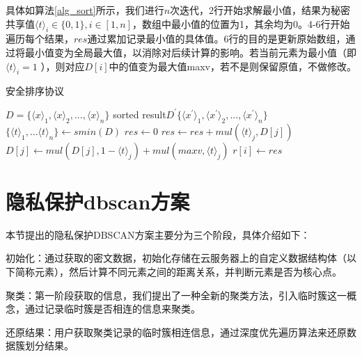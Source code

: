 具体如算法\ref{alg_sort}所示，我们进行$ n $次迭代，2行开始求解最小值，结果为秘密共享值$ \langle t \rangle_i \in \{0,1\}, i\in[1,n] $，数组中最小值的位置为1，其余均为0。4-6行开始遍历每个结果，$ res $通过累加记录最小值的具体值。6行的目的是更新原始数组，通过将最小值变为全局最大值，以消除对后续计算的影响。若当前元素为最小值（即$\langle t \rangle_i=1  $ ），则对应$ D[i] $中的值变为最大值maxv，若不是则保留原值，不做修改。
\begin{algorithm}[htbp]
	\renewcommand{\algorithmicrequire}{\textbf{输入:}}
	\renewcommand{\algorithmicensure}{\textbf{输出:}}
	\caption{安全排序协议}
	\label{alg_sort}
	\begin{algorithmic}[1]
		\REQUIRE $ D = \{\langle x\rangle_1, \langle x\rangle_2,...,\langle x\rangle_n\} $
		\ENSURE sorted result$ D^{\prime}\{\langle x^{\prime}\rangle_1, \langle x^{\prime}\rangle_2,...,\langle x^{\prime}\rangle_n\} $
		\STATE $ \{\langle t\rangle_1,...\langle t \rangle_n\} \leftarrow smin(D)$
		\STATE $ res \leftarrow 0 $
		\STATE $ res \leftarrow res + mul(\langle t \rangle_j, D[j]) $
		\STATE $ D[j] \leftarrow mul(D[j],1-\langle t \rangle_j) + mul(maxv, \langle t \rangle_j)$
		\ENDFOR
		\STATE $ r[i] \leftarrow res $
		\ENDFOR
	\end{algorithmic}
\end{algorithm}
\section{隐私保护dbscan方案}
\label{s4-t1}
本节提出的隐私保护DBSCAN方案主要分为三个阶段，具体介绍如下：
\begin{compactitem}
	\item 初始化：通过获取的密文数据，初始化存储在云服务器上的自定义数据结构体（以下简称元素），然后计算不同元素之间的距离关系，并判断元素是否为核心点。
	\item 聚类：第一阶段获取的信息，我们提出了一种全新的聚类方法，引入临时簇这一概念，通过记录临时簇是否相连的信息来聚类。
	\item 还原结果：用户获取聚类记录的临时簇相连信息，通过深度优先遍历算法来还原数据簇划分结果。
\end{compactitem}

